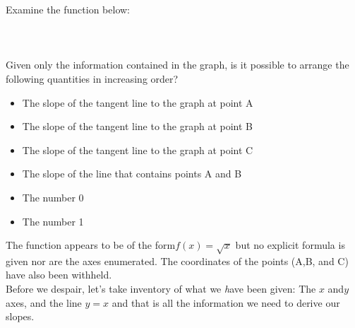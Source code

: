 \documentclass{article}
\begin{document}
\begin{enumerate}
\pagebreak
Examine the function below:\\
\\
\\
%
\\Given only the information contained in the graph, is it possible to arrange the following quantities in increasing order? 
%
\begin{itemize}
%
	\item The slope of the tangent line to the graph at point A
	\item The slope of the tangent line to the graph at point B
	\item The slope of the tangent line to the graph at point C
	\item The slope of the line that contains points A and B
	\item The number 0
	\item The number 1
%	
\end{itemize}
The function appears to be of the form$f(x)= \sqrt{x}$ but no explicit formula is given nor are the axes enumerated. The coordinates of the points (A,B, and C) have also been withheld.  \\

Before we despair, let's take inventory of what we \emph have been given: The $x$ and$ y$ axes, and the line {\color{red}$y = x$} and that is all the information we need to derive our slopes. \\


\end{enumerate}
\end{document}
